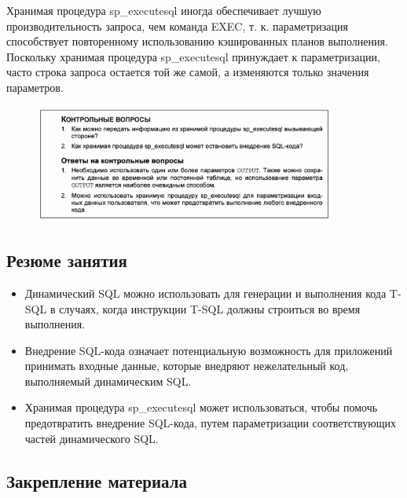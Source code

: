 Хранимая процедура sp\_executesql иногда обеспечивает лучшую производительность запроса, чем команда EXEC, т. к. параметризация способствует повторенному использованию кэшированных планов выполнения. Поскольку хранимая процедура
sp\_executesql принуждает к параметризации, часто строка запроса остается той же
самой, а изменяются только значения параметров.


\begin{figure}[h!]
	\begin{center}
		\includegraphics[width=0.9\textwidth]{img/control37.png}
	\end{center}
	\captionsetup{justification=centering}
\end{figure}



\subsection*{Резюме занятия}
\begin{itemize}
\item Динамический SQL можно использовать для генерации и выполнения кода
T-SQL в случаях, когда инструкции T-SQL должны строиться во время выполнения.
\item Внедрение SQL-кода означает потенциальную возможность для приложений
принимать входные данные, которые внедряют нежелательный код, выполняемый динамическим SQL. 
\item Хранимая процедура sp\_executesql может использоваться, чтобы помочь предотвратить внедрение SQL-кода, путем параметризации соответствующих частей
динамического SQL. 
\end{itemize}


\subsection*{Закрепление материала}

